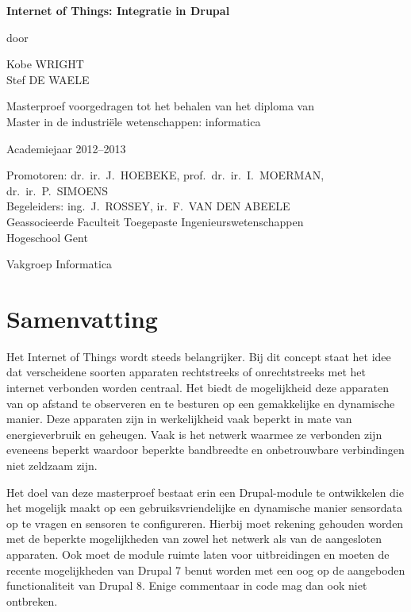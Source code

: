 
\newpage

{
\setlength{\baselineskip}{14pt}
\setlength{\parindent}{0pt}
\setlength{\parskip}{8pt}

\begin{center}

\noindent \textbf{\huge
Internet of Things: Integratie in Drupal
}

door 

Kobe WRIGHT\\
Stef DE WAELE

Masterproef voorgedragen tot het behalen van het diploma van\\
Master in de industri\"{e}le wetenschappen: informatica

Academiejaar 2012--2013

Promotoren: dr.~ir.~J.~HOEBEKE, prof.~dr.~ir.~I.~MOERMAN, dr.~ir.~P.~SIMOENS\\
Begeleiders: ing.~J.~ROSSEY, ir.~F.~VAN DEN ABEELE\\

Geassocieerde Faculteit Toegepaste Ingenieurswetenschappen\\
Hogeschool Gent

Vakgroep Informatica

\end{center}

\section*{Samenvatting}


Het Internet of Things wordt steeds belangrijker. Bij dit concept staat het idee dat verscheidene soorten apparaten rechtstreeks of onrechtstreeks met het internet verbonden worden centraal. Het biedt de mogelijkheid deze apparaten van op afstand te observeren en te besturen op een gemakkelijke en dynamische manier. Deze apparaten zijn in werkelijkheid vaak beperkt in mate van energieverbruik en geheugen. Vaak is het netwerk waarmee ze verbonden zijn eveneens beperkt waardoor beperkte bandbreedte en onbetrouwbare verbindingen niet zeldzaam zijn.

Het doel van deze masterproef bestaat erin een Drupal-module te ontwikkelen die het mogelijk maakt op een gebruiksvriendelijke en dynamische manier sensordata op te vragen en sensoren te configureren. Hierbij moet rekening gehouden worden met de beperkte mogelijkheden van zowel het netwerk als van de aangesloten apparaten. Ook moet de module ruimte laten voor uitbreidingen en moeten de recente mogelijkheden van Drupal 7 benut worden met een oog op de aangeboden functionaliteit van Drupal 8. Enige commentaar in code mag dan ook niet ontbreken.

}
